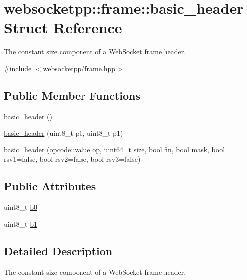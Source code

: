 \hypertarget{structwebsocketpp_1_1frame_1_1basic__header}{}\section{websocketpp\+:\+:frame\+:\+:basic\+\_\+header Struct Reference}
\label{structwebsocketpp_1_1frame_1_1basic__header}


The constant size component of a Web\+Socket frame header.  




{\ttfamily \#include $<$websocketpp/frame.\+hpp$>$}

\subsection*{Public Member Functions}
\begin{DoxyCompactItemize}
\item 
\hyperlink{structwebsocketpp_1_1frame_1_1basic__header_a96fc2802ba0909349105ab661f926459}{basic\+\_\+header} ()
\item 
\hyperlink{structwebsocketpp_1_1frame_1_1basic__header_ae5d978e632e2de210f0282d474870774}{basic\+\_\+header} (uint8\+\_\+t p0, uint8\+\_\+t p1)
\item 
\hyperlink{structwebsocketpp_1_1frame_1_1basic__header_aeacd25eb8ca55f29250dc5aff78a1788}{basic\+\_\+header} (\hyperlink{namespacewebsocketpp_1_1frame_1_1opcode_ae68711643096dfc4af6d66ade3f9fd5e}{opcode\+::value} op, uint64\+\_\+t size, bool fin, bool mask, bool rsv1=false, bool rsv2=false, bool rsv3=false)
\end{DoxyCompactItemize}
\subsection*{Public Attributes}
\begin{DoxyCompactItemize}
\item 
uint8\+\_\+t \hyperlink{structwebsocketpp_1_1frame_1_1basic__header_a9dcac77e651c455cf3aed687dbd87d7e}{b0}
\item 
uint8\+\_\+t \hyperlink{structwebsocketpp_1_1frame_1_1basic__header_a631a0cbf798d7996a4de1d62f03cc470}{b1}
\end{DoxyCompactItemize}


\subsection{Detailed Description}
The constant size component of a Web\+Socket frame header. 

